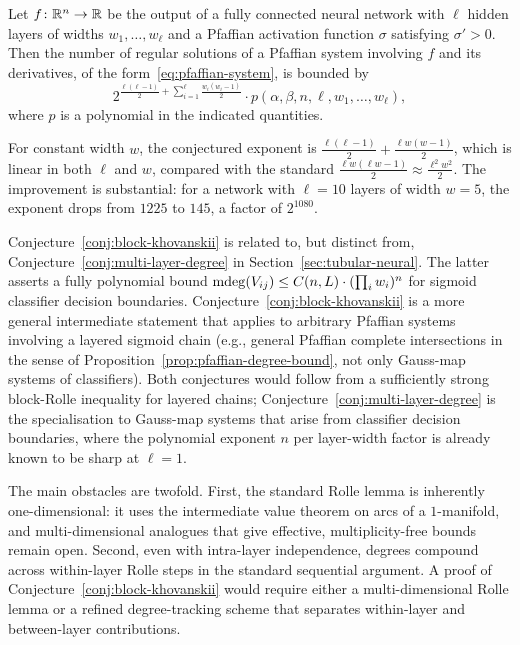 \begin{conjecture}\label{conj:block-khovanskii}
  Let $f\colon \mathbb{R}^n \to \mathbb{R}$ be the output of a fully connected neural network with $\ell$ hidden layers of widths $w_1, \ldots, w_\ell$ and a Pfaffian activation function $\sigma$ satisfying $\sigma' > 0$. Then the number of regular solutions of a Pfaffian system involving $f$ and its derivatives, of the form~\eqref{eq:pfaffian-system}, is bounded by
  \begin{equation*}
    2^{\frac{\ell(\ell-1)}{2} + \sum_{i=1}^{\ell}\frac{w_i(w_i-1)}{2}} \cdot p(\alpha, \beta, n, \ell, w_1, \ldots, w_\ell),
  \end{equation*}
  where $p$ is a polynomial in the indicated quantities.
\end{conjecture}

For constant width $w$, the conjectured exponent is $\frac{\ell(\ell-1)}{2} + \frac{\ell w(w-1)}{2}$, which is linear in both $\ell$ and $w$, compared with the standard $\frac{\ell w(\ell w-1)}{2} \approx \frac{\ell^2 w^2}{2}$. The improvement is substantial: for a network with $\ell = 10$ layers of width $w = 5$, the exponent drops from $1225$ to $145$, a factor of $2^{1080}$.

Conjecture~\ref{conj:block-khovanskii} is related to, but distinct from, Conjecture~\ref{conj:multi-layer-degree} in Section~\ref{sec:tubular-neural}. The latter asserts a fully polynomial bound $\operatorname{\mathrm{mdeg}}(V_{ij})\leq C(n,L)\cdot (\prod_i w_i)^n$ for sigmoid classifier decision boundaries. Conjecture~\ref{conj:block-khovanskii} is a more general intermediate statement that applies to arbitrary Pfaffian systems involving a layered sigmoid chain (e.g., general Pfaffian complete intersections in the sense of Proposition~\ref{prop:pfaffian-degree-bound}, not only Gauss-map systems of classifiers). Both conjectures would follow from a sufficiently strong block-Rolle inequality for layered chains; Conjecture~\ref{conj:multi-layer-degree} is the specialisation to Gauss-map systems that arise from classifier decision boundaries, where the polynomial exponent $n$ per layer-width factor is already known to be sharp at $\ell=1$.

The main obstacles are twofold. First, the standard Rolle lemma is inherently one-dimensional: it uses the intermediate value theorem on arcs of a $1$-manifold, and multi-dimensional analogues that give effective, multiplicity-free bounds remain open. Second, even with intra-layer independence, degrees compound across within-layer Rolle steps in the standard sequential argument. A proof of Conjecture~\ref{conj:block-khovanskii} would require either a multi-dimensional Rolle lemma or a refined degree-tracking scheme that separates within-layer and between-layer contributions.

